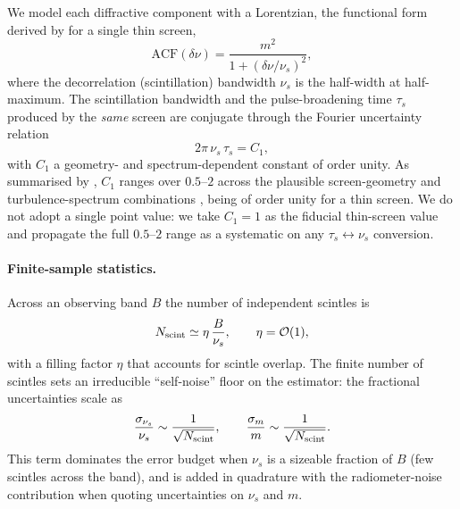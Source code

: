 We model each diffractive component with a Lorentzian, the functional form
derived by \citet{Gwinn1998} for a single thin screen,
%
\begin{equation}
\mathrm{ACF}(\delta\nu)
  = \frac{m^{2}}{1 + (\delta\nu/\nu_{s})^{2}},
\label{eq:lorentzian}
\end{equation}
%
where the decorrelation (scintillation) bandwidth $\nu_{s}$ is the
half-width at half-maximum. The scintillation bandwidth and the
pulse-broadening time $\tau_{s}$ produced by the \emph{same} screen are
conjugate through the Fourier uncertainty relation
%
\begin{equation}
2\pi\,\nu_{s}\,\tau_{s} = C_{1},
\label{eq:c1}
\end{equation}
%
with $C_{1}$ a geometry- and spectrum-dependent constant of order unity.
As summarised by \citet{Pradeep2025}, $C_{1}$ ranges over $0.5$--$2$
across the plausible screen-geometry and turbulence-spectrum combinations
\citep{LambertRickett1999}, being of order unity for a thin screen. We do
not adopt a single point value: we take $C_{1}=1$ as the fiducial thin-screen
value and propagate the full $0.5$--$2$ range as a systematic on any
$\tau_{s}\leftrightarrow\nu_{s}$ conversion.
%

\paragraph{Finite-sample statistics.}
Across an observing band $B$ the number of independent scintles is
%
\begin{equation}
N_{\rm scint} \simeq \eta\,\frac{B}{\nu_{s}},
\qquad \eta = \mathcal{O}(1),
\label{eq:nscint}
\end{equation}
%
with a filling factor $\eta$ that accounts for scintle overlap. The finite
number of scintles sets an irreducible ``self-noise'' floor on the
estimator: the fractional uncertainties scale as
%
\begin{equation}
\frac{\sigma_{\nu_{s}}}{\nu_{s}} \sim \frac{1}{\sqrt{N_{\rm scint}}},
\qquad
\frac{\sigma_{m}}{m} \sim \frac{1}{\sqrt{N_{\rm scint}}}.
\label{eq:selfnoise}
\end{equation}
%
This term dominates the error budget when $\nu_{s}$ is a sizeable fraction
of $B$ (few scintles across the band), and is added in quadrature with the
radiometer-noise contribution when quoting uncertainties on $\nu_{s}$ and
$m$.


